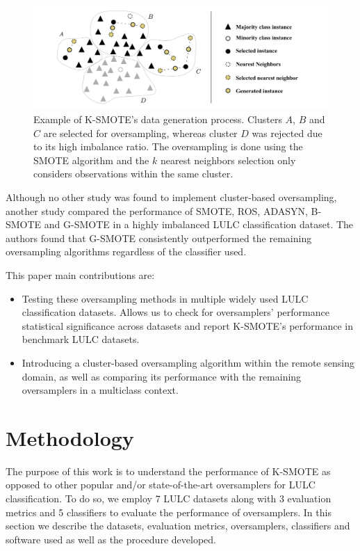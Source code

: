 \documentclass[parskip=full]{scrartcl}
\begin{document}
\begin{figure}[H]
	\centering
	\includegraphics[width=1\linewidth]{../analysis/kmeans_smote_example}
	\caption{Example of K-SMOTE's data generation process. Clusters $A$,
		$B$ and $C$ are selected for
		oversampling, whereas cluster $D$ was rejected due to its
		high imbalance ratio. The oversampling is done using the SMOTE algorithm and
		the $k$ nearest neighbors selection only considers
		observations within the same cluster.}
	\label{fig:kmeans_smote_example}
\end{figure}

Although no other study was found to implement cluster-based oversampling,
another study \cite{Douzas2019rs} compared the performance of SMOTE, ROS,
ADASYN, B-SMOTE and G-SMOTE in a highly imbalanced LULC classification dataset.
The authors found that G-SMOTE consistently outperformed the remaining
oversampling algorithms regardless of the classifier used.

This paper main contributions are:
\begin{itemize}
	\item Testing these oversampling methods in multiple widely used LULC classification
	      datasets. Allows us to check for oversamplers' performance statistical
	      significance across datasets and report K-SMOTE's performance in benchmark LULC
	      datasets.
	\item Introducing a cluster-based oversampling algorithm within the remote sensing
	      domain, as well as comparing its performance with the remaining oversamplers in
	      a multiclass context.

\end{itemize}

\section{Methodology}\label{sec:methodology}

The purpose of this work is to understand the performance of K-SMOTE as opposed to other popular
and/or state-of-the-art oversamplers for LULC classification. To do so, we employ 7 LULC datasets
along with 3 evaluation metrics and 5 classifiers to evaluate the performance of oversamplers. In
this section we describe the datasets, evaluation metrics, oversamplers, classifiers and software
used as well as the procedure developed.
\end{document}
